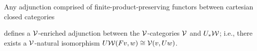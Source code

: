 \begin{lemma}\label{lem:enriched-cob-adjunction}
Any adjunction comprised of finite-product-preserving functors between cartesian closed categories
\begin{center}
\end{center}
defines a ${\mathord{\mathcal{V}}}$-enriched adjunction between the ${\mathord{\mathcal{V}}}$-categories ${\mathord{\mathcal{V}}}$ and $U_*{\mathord{\mathcal{W}}}$; i.e., there exists a ${\mathord{\mathcal{V}}}$-natural isomorphism $U{\mathord{\mathcal{W}}}(Fv,w) \cong {\mathord{\mathcal{V}}}(v,Uw)$.
\end{lemma}
